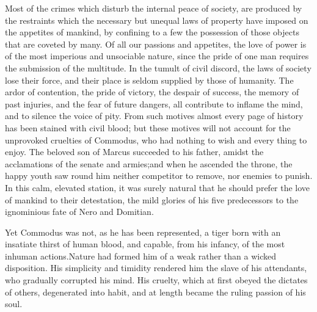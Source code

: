 Most of the crimes which disturb the internal peace of society,
are produced by the restraints which the necessary but unequal
laws of property have imposed on the appetites of mankind, by
confining to a few the possession of those objects that are
coveted by many. Of all our passions and appetites, the love of
power is of the most imperious and unsociable nature, since the
pride of one man requires the submission of the multitude. In the
tumult of civil discord, the laws of society lose their force,
and their place is seldom supplied by those of humanity. The
ardor of contention, the pride of victory, the despair of
success, the memory of past injuries, and the fear of future
dangers, all contribute to inflame the mind, and to silence the
voice of pity. From such motives almost every page of history has
been stained with civil blood; but these motives will not account
for the unprovoked cruelties of Commodus, who had nothing to wish
and every thing to enjoy. The beloved son of Marcus succeeded to
his father, amidst the acclamations of the senate and armies;\footnotemark[6]
and when he ascended the throne, the happy youth saw round him
neither competitor to remove, nor enemies to punish. In this
calm, elevated station, it was surely natural that he should
prefer the love of mankind to their detestation, the mild glories
of his five predecessors to the ignominious fate of Nero and
Domitian.


Yet Commodus was not, as he has been represented, a tiger born
with an insatiate thirst of human blood, and capable, from his
infancy, of the most inhuman actions.\footnotemark[7] Nature had formed him of
a weak rather than a wicked disposition. His simplicity and
timidity rendered him the slave of his attendants, who gradually
corrupted his mind. His cruelty, which at first obeyed the
dictates of others, degenerated into habit, and at length became
the ruling passion of his soul.\footnotemark[8]



